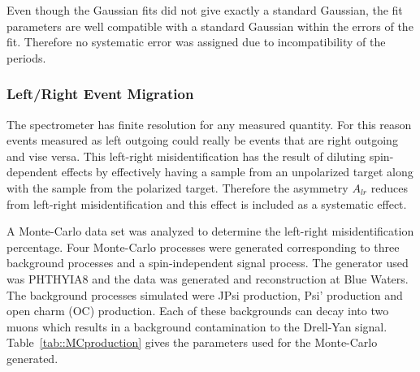 Even though the Gaussian fits did not give exactly a standard Gaussian, the fit
parameters are well compatible with a standard Gaussian within the errors of the
fit.  Therefore no systematic error was assigned due to incompatibility of the
periods.

\subsubsection{Left/Right Event Migration} \label{sec::syslrEventMigration}
The spectrometer has finite resolution for any measured quantity.  For this
reason events measured as left outgoing could really be events that are right
outgoing and vise versa.  This left-right misidentification has the result of
diluting spin-dependent effects by effectively having a sample from an
unpolarized target along with the sample from the polarized target.  Therefore
the asymmetry $A_{lr}$ reduces from left-right misidentification and this
effect is included as a systematic effect. 

A Monte-Carlo data set was analyzed to determine the left-right
misidentification percentage.  Four Monte-Carlo processes were generated
corresponding to three background processes and a spin-independent signal
process.  The generator used was PHTHYIA8 and the data was generated and
reconstruction at Blue Waters.  The background processes simulated were JPsi
production, Psi' production and open charm (OC) production.  Each of these
backgrounds can decay into two muons which results in a background contamination
to the Drell-Yan signal.  Table~\ref{tab::MCproduction} gives the parameters
used for the Monte-Carlo generated.

